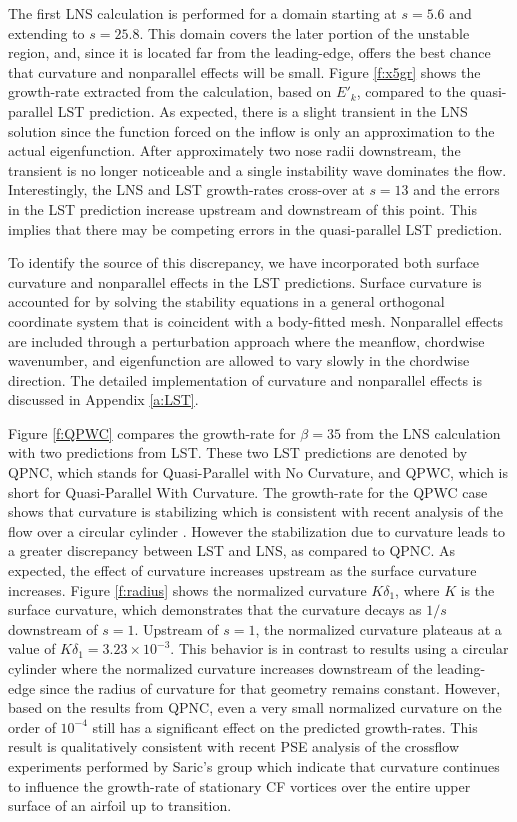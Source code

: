 The first LNS calculation is performed for a domain starting at $s=5.6$ and
extending to $s=25.8$.  This domain covers the later portion of the unstable
region, and, since it is located far from the leading-edge, offers the best
chance that curvature and nonparallel effects will be small.  Figure
\ref{f:x5gr} shows the growth-rate extracted from the calculation, based on
$E'_k$, compared to the quasi-parallel LST prediction.  As expected, there is
a slight transient in the LNS solution since the function forced on the inflow
is only an approximation to the actual eigenfunction.  After approximately two
nose radii downstream, the transient is no longer noticeable and a single
instability wave dominates the flow.  Interestingly, the LNS and LST
growth-rates cross-over at $s = 13$ and the errors in the LST prediction
increase upstream and downstream of this point.  This implies that there may
be competing errors in the quasi-parallel LST prediction.

To identify the source of this discrepancy, we have incorporated both surface
curvature and nonparallel effects in the LST predictions.  Surface curvature
is accounted for by solving the stability equations in a general orthogonal
coordinate system that is coincident with a body-fitted mesh.  Nonparallel
effects are included through a perturbation approach where the meanflow,
chordwise wavenumber, and eigenfunction are allowed to vary slowly in the
chordwise direction.  The detailed implementation of curvature and nonparallel
effects is discussed in Appendix \ref{a:LST}.

Figure \ref{f:QPWC} compares the growth-rate for $\beta=35$ from the LNS
calculation with two predictions from LST.  These two LST predictions are
denoted by QPNC, which stands for Quasi-Parallel with No Curvature, and QPWC,
which is short for Quasi-Parallel With Curvature.  The growth-rate for the
QPWC case shows that curvature is stabilizing which is consistent with recent
analysis of the flow over a circular cylinder \cite{MaMa:94}.  However the
stabilization due to curvature leads to a greater discrepancy between LST and
LNS, as compared to QPNC.  As expected, the effect of curvature increases
upstream as the surface curvature increases.  Figure \ref{f:radius} shows the
normalized curvature $K \delta_1$,
%
%
where $K$ is the surface curvature, which demonstrates that the curvature
decays as $1/s$ downstream of $s=1$.  Upstream of $s=1$, the normalized
curvature plateaus at a value of $K\delta_1 = 3.23\times 10^{-3}$.  This
behavior is in contrast to results using a circular cylinder where the
normalized curvature increases downstream of the leading-edge since the radius
of curvature for that geometry remains constant.  However, based on the
results from QPNC, even a very small normalized curvature on the order of
$10^{-4}$ still has a significant effect on the predicted growth-rates.  This
result is qualitatively consistent with recent PSE analysis \cite{HaRe:96} of
the crossflow experiments performed by Saric's group \cite{ReSaCaCh:96} which
indicate that curvature continues to influence the growth-rate of stationary
CF vortices over the entire upper surface of an airfoil up to transition.

